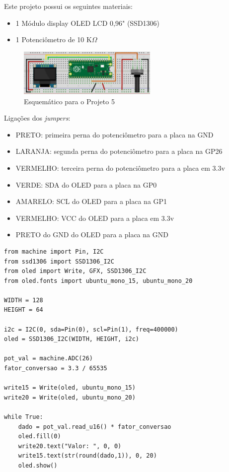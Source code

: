 \documentclass[a4paper,11pt]{article}
\begin{document}
Este projeto possui os seguintes materiais: \vspace{-1em}
\begin{itemize}
	\item 1 Módulo display OLED LCD 0,96" (SSD1306)
	\item 1 Potenciômetro de 10 K$\Omega$
\end{itemize}

\begin{figure}[H]
	\centering
	\includegraphics[width=0.6\textwidth]{imagem/PicoProj5}
	\caption{Esquemático para o Projeto 5}
\end{figure}

Ligações dos \textit{jumpers}: \vspace{-1em}
\begin{itemize}
	\item PRETO: primeira perna do potenciômetro para a placa na GND
	\item LARANJA: segunda perna do potenciômetro para a placa na GP26
	\item VERMELHO: terceira perna do potenciômetro para a placa em 3.3v
	\item VERDE: SDA do OLED para a placa na GP0
	\item AMARELO: SCL do OLED para a placa na GP1
	\item VERMELHO: VCC do OLED para a placa em 3.3v
	\item PRETO do GND do OLED para a placa na GND
\end{itemize}

\begin{lstlisting}
from machine import Pin, I2C
from ssd1306 import SSD1306_I2C
from oled import Write, GFX, SSD1306_I2C
from oled.fonts import ubuntu_mono_15, ubuntu_mono_20

WIDTH = 128
HEIGHT = 64

i2c = I2C(0, sda=Pin(0), scl=Pin(1), freq=400000)
oled = SSD1306_I2C(WIDTH, HEIGHT, i2c)

pot_val = machine.ADC(26)
fator_conversao = 3.3 / 65535

write15 = Write(oled, ubuntu_mono_15)
write20 = Write(oled, ubuntu_mono_20)

while True:
	dado = pot_val.read_u16() * fator_conversao
	oled.fill(0)
	write20.text("Valor: ", 0, 0)
	write15.text(str(round(dado,1)), 0, 20)
	oled.show()
\end{lstlisting}
\end{document}
